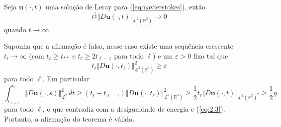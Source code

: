 \documentclass[a4paper, 11pt]{book}
\theoremstyle{definition}
\newcommand{\bR}{\mathbb{R}}
\newcommand{\bu}{\mathbf{u}}
\newcommand{\cL}{\mathcal{L}}
\begin{document}
\begin{tbox} \label{thm:Duto0}
    Seja $\bu(\cdot,t)$ uma solução de Leray para (\ref{eq:navierstokes}), então
    \[
        t^{\frac{1}{2}} \Vert D\bu(\cdot,t) \Vert_{\cL^2(\bR^3)} \to 0
    \]
    quando $t \to \infty$.
\end{tbox}
\begin{prf}
    Suponha que a afirmação é falsa, nesse caso existe uma sequência crescente $t_\ell \to \infty$ (com $t_\ell \geqslant t_{**}$ e $t_\ell \geqslant 2 t_{\ell -1}$ para todo $\ell$) e um $\varepsilon > 0$ fixo tal que
    \[
        t_\ell \Vert D\bu(\cdot,t_\ell) \Vert_{\cL^2(\bR^3)}^2 \geqslant \varepsilon
    \]
    para todo $\ell$.
    Em particular
    \[
        \int_{t_{\ell-1}}^{t_\ell} \Vert D\bu(\cdot,s) \Vert_{\cL^2}^2 \,dt \geqslant (t_\ell - t_{\ell-1}) \Vert D\bu(\cdot,t_\ell) \Vert_{\cL^2(\bR^3)}^2 \geqslant \frac{1}{2}t_\ell \Vert D\bu(\cdot,t) \Vert_{\cL^2(\bR^3)^2} \geqslant \frac{1}{2}\eta 
    \]
    para todo $\ell$, o que contradiz com a desigualdade de energia e (\ref{eq:2.3}). Portanto, a afirmação do teorema é válida.
\end{prf}
\end{document}

